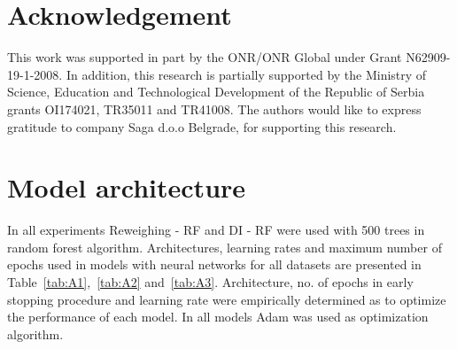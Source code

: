 \documentclass[preprint,12pt]{elsarticle}
\begin{document}
\section*{Acknowledgement}
This work was supported in part by the ONR/ONR Global under Grant N62909-19-1-2008. In addition, this research is partially supported by the Ministry of Science, Education and Technological Development of the Republic of Serbia grants OI174021, TR35011 and TR41008. The authors would like to express gratitude to company Saga d.o.o Belgrade, for supporting this research.




\appendix

\section{Model architecture}
\label{app:Architecture}

In all experiments Reweighing - RF and DI - RF were used with 500 trees in random forest algorithm. Architectures, learning rates and maximum number of epochs used in models with neural networks for all datasets are presented in Table~\ref{tab:A1},~\ref{tab:A2} and~\ref{tab:A3}. Architecture, no. of epochs in early stopping procedure and learning rate were empirically determined as to optimize the performance of each model. In all models Adam was used as optimization algorithm.
\end{document}
